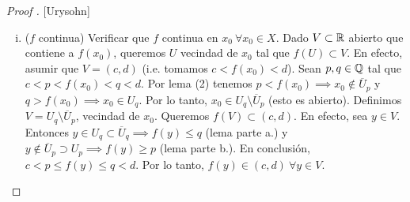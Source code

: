 \begin{proof}[Proof ][Urysohn]
\begin{enumerate}[i.]
		\item ($f$ continua) Verificar que $f$ continua en $x_{0}\ \forall x_{0} \in X$. Dado $V \subset \mathbb{R}$ abierto que contiene a $f(x_{0})$, queremos $U$ vecindad de $x_{0}$ tal que $f(U) \subset V$. En efecto, asumir que $V = (c,d)$ (i.e. tomamos $c < f(x_{0}) < d$). Sean $p,q \in \mathbb{Q}$ tal que $c < p < f(x_{0}) < q < d$. Por lema (2) tenemos $p < f(x_{0}) \implies x_{0} \not\in \overline{U}_{p}$ y $q > f(x_{0}) \implies x_{0} \in U_{q}$. Por lo tanto, $x_{0} \in U_{q} \setminus \overline{U}_{p}$ (esto es abierto). Definimos $V = U_{q} \setminus \overline{U}_{p}$, vecindad de $x_{0}$. Queremos $f(V) \subset (c,d)$. En efecto, sea $y \in V$. Entonces $y \in U_{q} \subset \overline{U}_{q} \implies f(y) \leq q$ (lema parte a.) y $y \not\in \overline{U}_{p} \supset U_{p} \implies f(y) \geq p$ (lema parte b.). En conclusión, $c < p \leq f(y) \leq q < d$. Por lo tanto, $f(y) \in (c,d) \ \forall y \in V$.
	\end{enumerate}
\end{proof}
